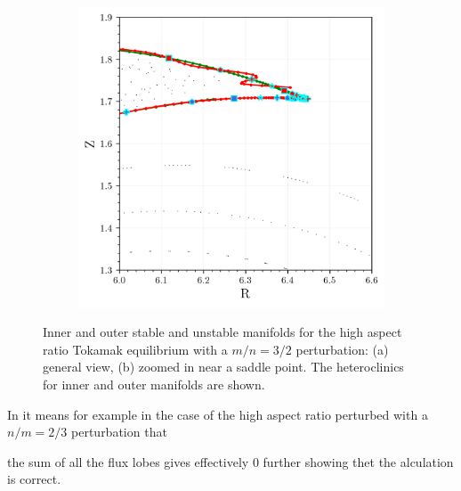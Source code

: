 \begin{figure}[h!]
\begin{subfigure}[c]{0.49\textwidth}
        \includegraphics[width=\textwidth]{images/high-aspect-ratio/closeup.png}
        \caption{}
    \end{subfigure}
    \caption{Inner and outer stable and unstable manifolds for the high aspect ratio Tokamak equilibrium with a $m/n = 3/2$ perturbation: (a) general view, (b) zoomed in near a saddle point. The heteroclinics for inner and outer manifolds are shown.}
    \label{fig:inner-outer}
\end{figure}

In  it means for example in the case of the high aspect ratio perturbed with a $n/m = 2/3$ perturbation that

the sum of all the flux lobes gives effectively 0 further showing thet the alculation is correct.